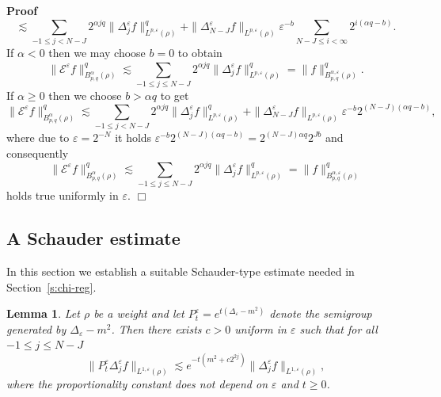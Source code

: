 \documentclass[a4paper,11pt]{article}
\newenvironment{proof}{\noindent\textbf{Proof\ }}{\hspace*{\fill}$\Box$\medskip}
\newtheorem{lemma}[theorem]{Lemma}
\numberwithin{equation}{section}
\begin{document}
\begin{proof}
  \[ \lesssim \sum_{- 1 \leqslant j < N - J} 2^{\alpha j q} \|
     \Delta^{\varepsilon}_j f \|^q_{L^{p, \varepsilon} (\rho)} + \|
     \Delta^{\varepsilon}_{N - J} f \|_{L^{p, \varepsilon} (\rho)}
     \varepsilon^{- b} \sum_{N - J \leqslant i < \infty} 2^{i (\alpha q - b)}
     . \]
  If $\alpha < 0$ then we may choose $b = 0$ to obtain
  \[ \| \mathcal{E}^{\varepsilon} f \|_{B^{\alpha}_{p, q} (\rho)}^q \lesssim
     \sum_{- 1 \leqslant j \leqslant N - J} 2^{\alpha j q} \|
     \Delta^{\varepsilon}_j f \|^q_{L^{p, \varepsilon} (\rho)} = \| f
     \|_{B^{\alpha, \varepsilon}_{p, q} (\rho)}^q . \]
  If $\alpha \geqslant 0$ then we choose $b > \alpha q$ to get
  \[ \| \mathcal{E}^{\varepsilon} f \|_{B^{\alpha}_{p, q} (\rho)}^q \lesssim
     \sum_{- 1 \leqslant j < N - J} 2^{\alpha j q} \| \Delta^{\varepsilon}_j f
     \|^q_{L^{p, \varepsilon} (\rho)} + \| \Delta^{\varepsilon}_{N - J} f
     \|_{L^{p, \varepsilon} (\rho)} \varepsilon^{- b} 2^{(N - J) (\alpha q -
     b)}, \]
  where due to $\varepsilon = 2^{- N}$ it holds
  $\varepsilon^{- b} 2^{(N - J) (\alpha q - b)} = 2^{(N-J) \alpha q} 2^{J
      b} $
  and consequently
  \[ \| \mathcal{E}^{\varepsilon} f \|_{B^{\alpha}_{p, q} (\rho)}^q \lesssim
     \sum_{- 1 \leqslant j \leqslant N - J} 2^{\alpha j q} \|
     \Delta^{\varepsilon}_j f \|^q_{L^{p, \varepsilon} (\rho)} = \| f
     \|_{B^{\alpha, \varepsilon}_{p, q} (\rho)}^q \]
  holds true uniformly in $\varepsilon$.
  \end{proof}
  
  
\subsection{A Schauder estimate}

In this section we establish a suitable Schauder-type estimate needed in Section~\ref{s:chi-reg}.


\begin{lemma}
  \label{lem:Pt}Let $\rho$ be a weight and let $P^{\varepsilon}_t = e^{t
  (\Delta_{\varepsilon} - m^2)}$ denote the semigroup generated by
  $\Delta_{\varepsilon} - m^2$. Then there exists $c > 0$ uniform in
  $\varepsilon$ such that for all $- 1 \leqslant j \leqslant N - J$
  \[ \| P^{\varepsilon}_t \Delta^{\varepsilon}_j f \|_{L^{1, \varepsilon}
     (\rho)} \lesssim e^{- t (m^2 + c 2^{2 j})} \| \Delta^{\varepsilon}_j f
     \|_{L^{1, \varepsilon} (\rho)}, \]
  where the proportionality constant does not depend on $\varepsilon$ and $t
  \geqslant 0$.
\end{lemma}
\end{document}
